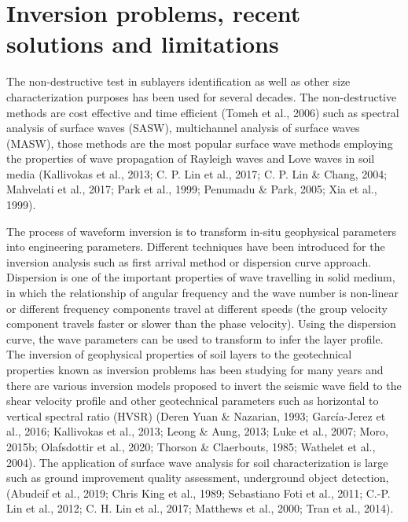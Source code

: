 \section*{Inversion problems, recent solutions and limitations}

The non-destructive test in sublayers identification as well as other size characterization purposes has been used for several decades. The non-destructive methods are cost effective and time efficient (Tomeh et al., 2006) such as spectral analysis of surface waves (SASW), multichannel analysis of surface waves (MASW), those methods are the most popular surface wave methods employing the properties of wave propagation of Rayleigh waves and Love waves in soil media  (Kallivokas et al., 2013; C. P. Lin et al., 2017; C. P. Lin \& Chang, 2004; Mahvelati et al., 2017; Park et al., 1999; Penumadu \& Park, 2005; Xia et al., 1999). 

The process of waveform inversion is to transform in-situ geophysical parameters into engineering parameters. Different techniques have been introduced for the inversion analysis such as first arrival method or dispersion curve approach. Dispersion is one of the important properties of wave travelling in solid medium, in which the relationship of angular frequency and the wave number is non-linear or different frequency components travel at different speeds (the group velocity component travels faster or slower than the phase velocity). Using the dispersion curve, the wave parameters can be used to transform to infer the layer profile. The inversion of geophysical properties of soil layers to the geotechnical properties known as inversion problems has been studying for many years and there are various inversion models proposed to invert the seismic wave field to the shear velocity profile and other geotechnical parameters such as horizontal to vertical spectral ratio (HVSR) (Deren Yuan \& Nazarian, 1993; García-Jerez et al., 2016; Kallivokas et al., 2013; Leong \& Aung, 2013; Luke et al., 2007; Moro, 2015b; Olafsdottir et al., 2020; Thorson \& Claerbouts, 1985; Wathelet et al., 2004). The application of surface wave analysis for soil characterization is large such as ground improvement quality assessment, underground object detection, (Abudeif et al., 2019; Chris King et al., 1989; Sebastiano Foti et al., 2011; C.-P. Lin et al., 2012; C. H. Lin et al., 2017; Matthews et al., 2000; Tran et al., 2014). 

